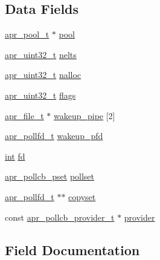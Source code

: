 \subsection*{Data Fields}
\begin{DoxyCompactItemize}
\item 
\hyperlink{structapr__pool__t}{apr\+\_\+pool\+\_\+t} $\ast$ \hyperlink{structapr__pollcb__t_a6d9b05e3797933c5e537312fe772b6a8}{pool}
\item 
\hyperlink{group__apr__platform_ga558548a135d8a816c4787250744ea147}{apr\+\_\+uint32\+\_\+t} \hyperlink{structapr__pollcb__t_ab6ba300bcd03fb92a16163b866bd5b5e}{nelts}
\item 
\hyperlink{group__apr__platform_ga558548a135d8a816c4787250744ea147}{apr\+\_\+uint32\+\_\+t} \hyperlink{structapr__pollcb__t_a6b43d3034680d3227eadad8569837c2e}{nalloc}
\item 
\hyperlink{group__apr__platform_ga558548a135d8a816c4787250744ea147}{apr\+\_\+uint32\+\_\+t} \hyperlink{structapr__pollcb__t_a01d83fb6addada1c1dfc380e68190c00}{flags}
\item 
\hyperlink{structapr__file__t}{apr\+\_\+file\+\_\+t} $\ast$ \hyperlink{structapr__pollcb__t_a09bc1fda39715e7bada816353921db11}{wakeup\+\_\+pipe} \mbox{[}2\mbox{]}
\item 
\hyperlink{structapr__pollfd__t}{apr\+\_\+pollfd\+\_\+t} \hyperlink{structapr__pollcb__t_a10d7ad8140671fc7ec01282be5410a68}{wakeup\+\_\+pfd}
\item 
\hyperlink{pcre_8txt_a42dfa4ff673c82d8efe7144098fbc198}{int} \hyperlink{structapr__pollcb__t_a109b84513925368dd7f1b1fb1653c198}{fd}
\item 
\hyperlink{unionapr__pollcb__pset}{apr\+\_\+pollcb\+\_\+pset} \hyperlink{structapr__pollcb__t_a4334b3d1e7a4b9acbb633d3575ae389d}{pollset}
\item 
\hyperlink{structapr__pollfd__t}{apr\+\_\+pollfd\+\_\+t} $\ast$$\ast$ \hyperlink{structapr__pollcb__t_ae057ae42284f10a37470369b36815e06}{copyset}
\item 
const \hyperlink{structapr__pollcb__provider__t}{apr\+\_\+pollcb\+\_\+provider\+\_\+t} $\ast$ \hyperlink{structapr__pollcb__t_a1a37e54764975f049ff4b5c300214122}{provider}
\end{DoxyCompactItemize}


\subsection{Field Documentation}
